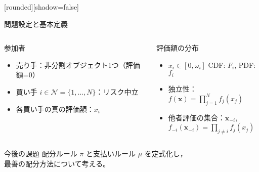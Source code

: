 \documentclass[dvipdfmx,autodetect-engine]{beamer}
\begin{document}
[rounded][shadow=false]
\setlength{\columnsep}{1em}

\begin{frame}{問題設定と基本定義}
  \begin{columns}[T,onlytextwidth]
      \begin{block}{参加者}
        \begin{itemize}
          \item 売り手：非分割オブジェクト1つ（評価額=0）
          \item 買い手 $i\in\mathcal{N}=\{1,\dots,N\}$：リスク中立
          \item 各買い手の真の評価額：$x_i$
        \end{itemize}
      \end{block}

      \begin{block}{評価額の分布}
        \begin{itemize}
          \item $x_i\in[0,\omega_i]$ CDF: $F_i$, PDF: $f_i$
          \item 独立性：$f(\bm x)=\prod_{j=1}^N f_j(x_j)$
          \item 他者評価の集合：$\bm x_{-i}$, \\
                $f_{-i}(\bm x_{-i})=\prod_{j\neq i}f_j(x_j)$
        \end{itemize}
      \end{block}
  \end{columns}

  \vspace{1ex}
  \begin{block}{今後の課題}
    配分ルール $\pi$ と支払いルール $\mu$ を定式化し，\\
    最善の配分方法について考える。
  \end{block}
\end{frame}
\end{document}
